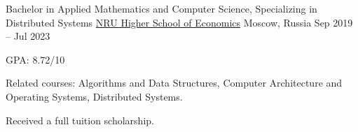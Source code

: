 

\begin{cventries}

  \cventry
  {Bachelor in Applied Mathematics and Computer Science, Specializing in Distributed Systems} %
  {\href{https://www.hse.ru/en/}{NRU Higher School of Economics}} %
  {Moscow, Russia} %
  {Sep 2019 -- Jul 2023} %
  {
    \begin{cvitems} %
      \item GPA: 8.72/10
      \item Related courses:
      Algorithms and Data Structures,
      Computer Architecture and Operating Systems,
      Distributed Systems.
      \item Received a full tuition scholarship.
    \end{cvitems}
  }

\end{cventries}
